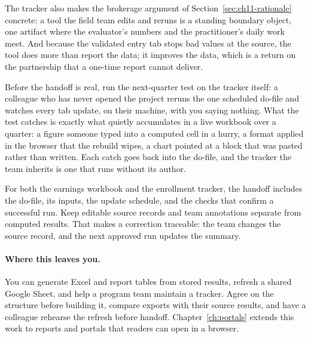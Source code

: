 The tracker also makes the brokerage argument of Section~\ref{sec:ch11-rationale} concrete: a tool the field team edits and reruns is a standing boundary object, one artifact where the evaluator's numbers and the practitioner's daily work meet. And because the validated entry tab stops bad values at the source, the tool does more than report the data; it improves the data, which is a return on the partnership that a one-time report cannot deliver.

Before the handoff is real, run the next-quarter test on the tracker itself: a colleague who has never opened the project reruns the one scheduled do-file and watches every tab update, on their machine, with you saying nothing. What the test catches is exactly what quietly accumulates in a live workbook over a quarter: a figure someone typed into a computed cell in a hurry, a format applied in the browser that the rebuild wipes, a chart pointed at a block that was pasted rather than written. Each catch goes back into the do-file, and the tracker the team inherits is one that runs without its author.

For both the earnings workbook and the enrollment tracker, the handoff includes the do-file, its inputs, the update schedule, and the checks that confirm a successful run. Keep editable source records and team annotations separate from computed results. That makes a correction traceable: the team changes the source record, and the next approved run updates the summary.

\paragraph{Where this leaves you.} You can generate Excel and report tables from stored results, refresh a shared Google Sheet, and help a program team maintain a tracker. Agree on the structure before building it, compare exports with their source results, and have a colleague rehearse the refresh before handoff. Chapter~\ref{ch:portals} extends this work to reports and portals that readers can open in a browser.

